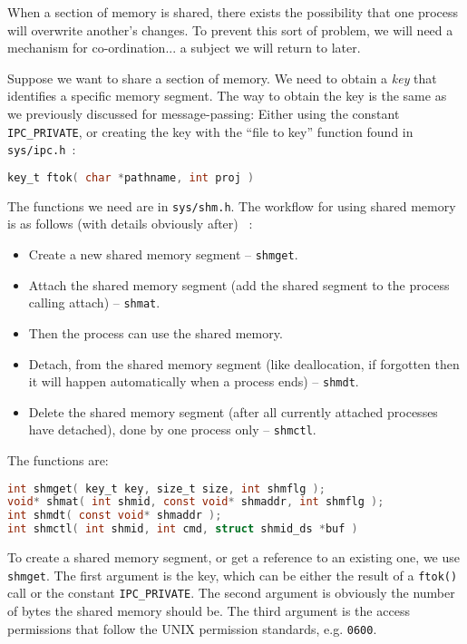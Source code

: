 When a section of memory is shared, there exists the possibility that one process will overwrite another's changes. To prevent this sort of problem, we will need a mechanism for co-ordination... a subject we will return to later.

Suppose we want to share a section of memory. We need to obtain a \textit{key} that identifies a specific memory segment. The way to obtain the key is the same as we previously discussed for message-passing: Either using the constant \texttt{IPC\_PRIVATE}, or creating the key with the ``file to key'' function found in \texttt{sys/ipc.h}~\cite{lpi}:
\begin{lstlisting}[language=C]
key_t ftok( char *pathname, int proj )
\end{lstlisting}

The functions we need are in \texttt{sys/shm.h}. The workflow for using shared memory is as follows (with details obviously after) ~\cite{lpi}:
\begin{itemize}
	\item Create a new shared memory segment -- \texttt{shmget}.
	\item Attach the shared memory segment (add the shared segment to the process calling attach) -- \texttt{shmat}.
	\item Then the process can use the shared memory.
	\item Detach, from the shared memory segment (like deallocation, if forgotten then it will happen automatically when a process ends) -- \texttt{shmdt}.
	\item Delete the shared memory segment (after all currently attached processes have detached), done by one process only -- \texttt{shmctl}.
\end{itemize}

The functions are:

\begin{lstlisting}[language=C]
int shmget( key_t key, size_t size, int shmflg );
void* shmat( int shmid, const void* shmaddr, int shmflg );
int shmdt( const void* shmaddr );
int shmctl( int shmid, int cmd, struct shmid_ds *buf )
\end{lstlisting}

To create a shared memory segment, or get a reference to an existing one, we use \texttt{shmget}. The first argument is the key, which can be either the result of a \texttt{ftok()} call or the constant \texttt{IPC\_PRIVATE}. The second argument is obviously the number of bytes the shared memory should be. The third argument is the access permissions that follow the UNIX permission standards, e.g. \texttt{0600}.

